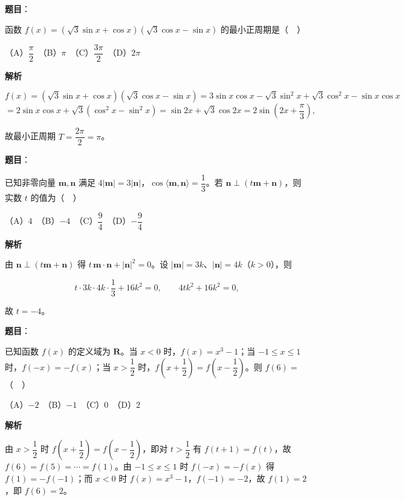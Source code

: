 \begin{answer}

\textbf{题目}：

函数 \(f(x)=(\sqrt{3}\sin x+\cos x)(\sqrt{3}\cos x-\sin x)\) 的最小正周期是（　）

（A）\(\dfrac{\pi}{2}\)　（B）\(\pi\)　（C）\(\dfrac{3\pi}{2}\)　（D）\(2\pi\)

\textbf{解析}

\nopagebreak[4]
\[
f(x)=(\sqrt{3}\sin x+\cos x)(\sqrt{3}\cos x-\sin x)=3\sin x\cos x-\sqrt{3}\sin^{2}x+\sqrt{3}\cos^{2}x-\sin x\cos x
\]
\nopagebreak[4]
\[
=2\sin x\cos x+\sqrt{3}(\cos^{2}x-\sin^{2}x)=\sin 2x+\sqrt{3}\cos 2x=2\sin\left(2x+\dfrac{\pi}{3}\right),
\]

故最小正周期 \(T=\dfrac{2\pi}{2}=\pi\)。


\end{answer}
\begin{answer}

\textbf{题目}：

已知非零向量 \(\mathbf{m},\mathbf{n}\) 满足 \(4|\mathbf{m}|=3|\mathbf{n}|\)，\(\cos\langle\mathbf{m},\mathbf{n}\rangle=\dfrac{1}{3}\)。若 \(\mathbf{n}\perp(t\mathbf{m}+\mathbf{n})\)，则实数 \(t\) 的值为（　）

（A）\(4\)　（B）\(-4\)　（C）\(\dfrac{9}{4}\)　（D）\(-\dfrac{9}{4}\)

\textbf{解析}

由 \(\mathbf{n}\perp(t\mathbf{m}+\mathbf{n})\) 得 \(t\,\mathbf{m}\cdot\mathbf{n}+|\mathbf{n}|^{2}=0\)。设 \(|\mathbf{m}|=3k\)、\(|\mathbf{n}|=4k\)（\(k>0\)），则

\nopagebreak[4]
\[
t\cdot 3k\cdot 4k\cdot\dfrac{1}{3}+16k^{2}=0,\qquad 4tk^{2}+16k^{2}=0,
\]

故 \(t=-4\)。


\end{answer}
\begin{answer}

\textbf{题目}：

已知函数 \(f(x)\) 的定义域为 \(\mathbf{R}\)。当 \(x<0\) 时，\(f(x)=x^{3}-1\)；当 \(-1\leqslant x\leqslant 1\) 时，\(f(-x)=-f(x)\)；当 \(x>\dfrac{1}{2}\) 时，\(f\left(x+\dfrac{1}{2}\right)=f\left(x-\dfrac{1}{2}\right)\)。则 \(f(6)=\)（　）

（A）\(-2\)　（B）\(-1\)　（C）\(0\)　（D）\(2\)

\textbf{解析}

由 \(x>\dfrac{1}{2}\) 时 \(f\left(x+\dfrac{1}{2}\right)=f\left(x-\dfrac{1}{2}\right)\)，即对 \(t>\dfrac{1}{2}\) 有 \(f(t+1)=f(t)\)，故 \(f(6)=f(5)=\cdots=f(1)\)。由 \(-1\leqslant x\leqslant 1\) 时 \(f(-x)=-f(x)\) 得 \(f(1)=-f(-1)\)；而 \(x<0\) 时 \(f(x)=x^{3}-1\)，\(f(-1)=-2\)，故 \(f(1)=2\)，即 \(f(6)=2\)。


\end{answer}
